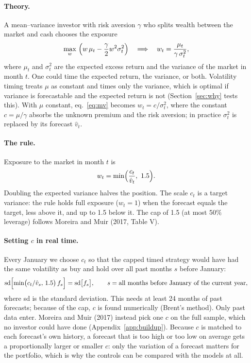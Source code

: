 \documentclass[12pt]{article}
\begin{document}
\paragraph{Theory.} A mean--variance investor with risk aversion $\gamma$ who splits wealth between the market and cash chooses the exposure
\begin{equation}\label{eq:mv}
\max_w\ \Bigl(w\,\mu_t-\frac{\gamma}{2}w^2\sigma_t^2\Bigr)\quad\Longrightarrow\quad w_t=\frac{\mu_t}{\gamma\,\sigma_t^2},
\end{equation}
where $\mu_t$ and $\sigma_t^2$ are the expected excess return and the variance of the market in month $t$. One could time the expected return, the variance, or both. Volatility timing treats $\mu$ as constant and times only the variance, which is optimal if variance is forecastable and the expected return is not (Section~\ref{sec:why} tests this). With $\mu$ constant, eq.~\eqref{eq:mv} becomes $w_t=c/\sigma_t^2$, where the constant $c=\mu/\gamma$ absorbs the unknown premium and the risk aversion; in practice $\sigma_t^2$ is replaced by its forecast $\hat v_t$.

\paragraph{The rule.} Exposure to the market in month $t$ is
\begin{equation}\label{eq:rule}
w_t=\min\Bigl(\frac{c_t}{\hat v_t},\ 1.5\Bigr).
\end{equation}
Doubling the expected variance halves the position. The scale $c_t$ is a target variance: the rule holds full exposure ($w_t=1$) when the forecast equals the target, less above it, and up to 1.5 below it. The cap of 1.5 (at most 50\% leverage) follows Moreira and Muir (2017, Table V).

\paragraph{Setting $c$ in real time.} Every January we choose $c_t$ so that the capped timed strategy would have had the same volatility as buy and hold over all past months $s$ before January:
\begin{equation}\label{eq:c}
\operatorname{sd}\Bigl[\min\bigl(c_t/\hat v_s,\,1.5\bigr)\,f_s\Bigr]=\operatorname{sd}\bigl[f_s\bigr],\qquad s=\text{all months before January of the current year},
\end{equation}
where sd is the standard deviation. This needs at least 24 months of past forecasts; because of the cap, $c$ is found numerically (Brent's method). Only past data enter. Moreira and Muir (2017) instead pick one $c$ on the full sample, which no investor could have done (Appendix~\ref{app:buildup}). Because $c$ is matched to each forecast's own history, a forecast that is too high or too low on average gets a proportionally larger or smaller $c$: only the variation of a forecast matters for the portfolio, which is why the controls can be compared with the models at all.
\end{document}
